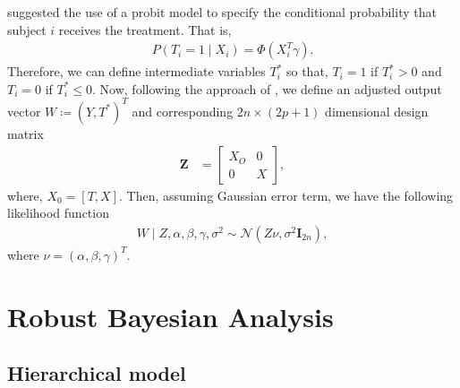 \documentclass{amsart}
\newcommand{\normal}{\mathcal{N}}
\begin{document}
\citet{koch2020} suggested the use of a probit model to specify the conditional probability that
subject $i$ receives the treatment. That is,
\begin{align}
    P(T_i=1\mid X_i) = \Phi(X_i^T\gamma).
\end{align}
Therefore, we can define intermediate variables $T_i^*$ so that, $T_i=1$ if $T_i^*>0$ and
$T_i=0$ if $T_i^*\le0$. Now, following the approach of \citet{koch2018}, we define an adjusted
output vector $W\coloneqq(Y, T^*)^T$ and corresponding $2n\times(2p+1)$ dimensional design matrix
\begin{align}
    \boldsymbol{Z} &=
    \begin{bmatrix}
     X_O & 0 \\
     0 & X
    \end{bmatrix},
\end{align}
where, $X_0 = [T, X]$. Then, assuming Gaussian error term, we have the following likelihood function
\begin{align}
W\mid Z, \alpha, \beta, \gamma, \sigma^2 \sim\normal\left(Z\nu, \sigma^2\mathbf{I}_{2n}\right),
\end{align}
where $\nu = (\alpha, \beta, \gamma)^T$.

\section{Robust Bayesian Analysis}
\subsection{Hierarchical model}
\end{document}
